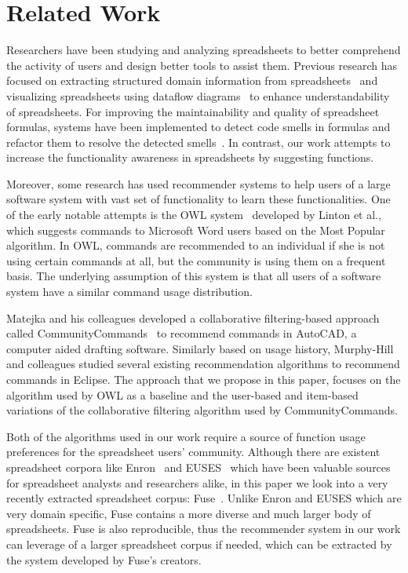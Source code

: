 \documentclass{article} %
\begin{document}

\section{Related Work}
Researchers have been studying and analyzing spreadsheets to better comprehend the activity of users and design better tools to assist them. Previous research has focused on extracting structured domain information from spreadsheets~\cite{hermans2010automatically} and visualizing spreadsheets using dataflow diagrams~\cite{hermans2011breviz} to enhance understandability of spreadsheets. For improving the maintainability and quality of spreadsheet formulas, systems have been implemented to detect code smells in formulas and refactor them to resolve the detected smells~\cite{hermans2014detecting}. In contrast, our work attempts to increase the functionality awareness in spreadsheets by suggesting functions.

Moreover, some research has used recommender systems to help users of a large software system with vast set of functionality to learn these functionalities. One of the early notable attempts is the OWL system~\cite{linton2000owl} developed by Linton et al., which suggests commands to Microsoft Word users based on the Most Popular algorithm. In OWL, commands are recommended to an individual if she is not using certain commands at all, but the community is using them on a frequent basis. The underlying assumption of this system is that all users of a software system have a similar command usage distribution.

Matejka and his colleagues developed a collaborative filtering-based approach called CommunityCommands~\cite{matejka2009communitycommands} to recommend commands in AutoCAD, a computer aided drafting software. Similarly based on usage history, Murphy-Hill and colleagues studied several existing recommendation algorithms to recommend commands in Eclipse. The approach that we propose in this paper, focuses on the algorithm used by OWL as a baseline and the user-based and item-based variations of the collaborative filtering algorithm used by CommunityCommands.

Both of the algorithms used in our work require a source of function usage preferences for the spreadsheet users' community. Although there are existent spreadsheet corpora like Enron~\cite{hermans2014enron} and EUSES~\cite{fisher2005euses} which have been valuable sources for spreadsheet analysts and researchers alike, in this paper we look into a very recently extracted spreadsheet corpus: Fuse~\cite{barik2015fuse}. Unlike Enron and EUSES which are very domain specific, Fuse contains a more diverse and much larger body of spreadsheets. Fuse is also reproducible, thus the recommender system in our work can leverage of a larger spreadsheet corpus if needed, which can be extracted by the system developed by Fuse's creators.
\end{document}
